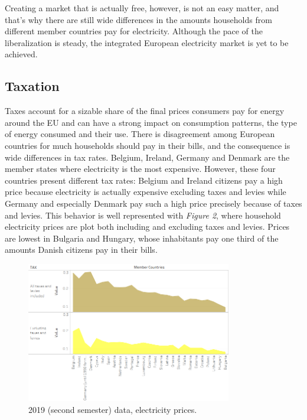 \documentclass{book}
\begin{document}
Creating a market that is actually free, however, is not an easy matter, and that's why there are still wide differences in the amounts households from different member countries pay for electricity. Although the pace of the liberalization is steady, the integrated European electricity market is yet to be achieved. \\

\subsection*{Taxation}

Taxes account for a sizable share of the final prices consumers pay for energy around the EU and can have a strong impact on consumption patterns, the type of energy consumed and their use. There is disagreement among European countries for much households should pay in their bills, and the consequence is wide differences in tax rates. Belgium, Ireland, Germany and Denmark are the member states where electricity is the most expensive. However, these four countries present different tax rates: Belgium and Ireland citizens pay a high price because electricity is actually expensive excluding taxes and levies while Germany and especially Denmark pay such a high price precisely because of taxes and levies. This behavior is well represented with \textit{Figure 2}, where household electricity prices are plot both including and excluding taxes and levies. Prices are lowest in Bulgaria and Hungary, whose inhabitants pay one third of the amounts Danish citizens pay in their bills. 

\bigskip
\begin{figure}[H]
\begin{center}
\captionsetup{justification=centering}
\includegraphics[width=0.8\textwidth]{Images/Taxes.png}
\caption{2019 (second semester) data, electricity prices. }
\end{center}
\end{figure}
\bigskip
\end{document}
